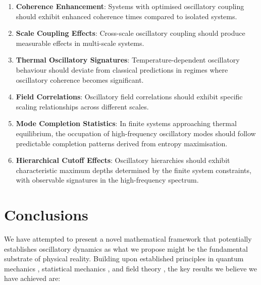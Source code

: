 \documentclass[11pt]{article}
\theoremstyle{remark}
\begin{document}
\begin{enumerate}
\item \textbf{Coherence Enhancement}: Systems with optimised oscillatory coupling should exhibit enhanced coherence times compared to isolated systems.

\item \textbf{Scale Coupling Effects}: Cross-scale oscillatory coupling should produce measurable effects in multi-scale systems.

\item \textbf{Thermal Oscillatory Signatures}: Temperature-dependent oscillatory behaviour should deviate from classical predictions in regimes where oscillatory coherence becomes significant.

\item \textbf{Field Correlations}: Oscillatory field correlations should exhibit specific scaling relationships across different scales.

\item \textbf{Mode Completion Statistics}: In finite systems approaching thermal equilibrium, the occupation of high-frequency oscillatory modes should follow predictable completion patterns derived from entropy maximisation.

\item \textbf{Hierarchical Cutoff Effects}: Oscillatory hierarchies should exhibit characteristic maximum depths determined by the finite system constraints, with observable signatures in the high-frequency spectrum.
\end{enumerate}

\section{Conclusions}

We have attempted to present a novel mathematical framework that potentially establishes oscillatory dynamics as what we propose might be the fundamental substrate of physical reality. Building upon established principles in quantum mechanics \cite{dirac1958quantum}, statistical mechanics \cite{pathria2011statistical}, and field theory \cite{weinberg1995quantum}, the key results we believe we have achieved are:
\end{document}
